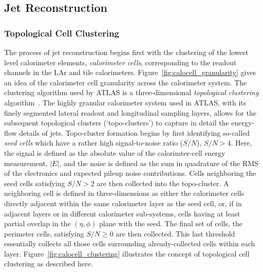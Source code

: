 \FloatBarrier
\subsection{Jet Reconstruction}
\label{sec:jet_reco}

\subsubsection{Topological Cell Clustering}
\label{sec:jet_topo_cluster}

The process of jet reconstruction begins first with the clustering of the lowest level calorimeter elements,
\textit{calorimeter cells}, corresponding to the readout channels in the LAr and tile calorimeters.
Figure~\ref{fig:calocell_granularity} gives an idea of the calorimeter cell granularity across the calorimeter
system.
The clustering algorithm used by ATLAS is a three-dimensional \textit{topological clustering} algorithm~\cite{Lampl:2008zz,Aad:2016upy}.
The highly granular calorimeter system used in ATLAS, with its finely segmented lateral readout and longitudinal sampling layers,
allows for the subsequent topological clusters (`topo-clusters') to capture in detail the energy-flow details of jets.
Topo-cluster formation begins by first identifying so-called \textit{seed cells} which have a rather high signal-to-noise ratio ($S/N$),
$S/N>4$.
Here, the signal is defined as the absolute value of the calorimter-cell energy measurement, $\lvert E \rvert$,
and the noise is defined as the sum in quadrature of the RMS of the electronics and expected pileup noise contributions.
Cells neighboring the seed cells satisfying $S/N>2$ are then collected into the topo-cluster.
A neighboring cell is defined in three-dimensions as either the calorimeter cells directly adjacent within the same calorimeter layer as
the seed cell, or, if in adjacent layers or in different calorimeter sub-systems, cells having at least partial overlap
in the $(\eta,\phi)$ plane with the seed.
The final set of cells, the perimeter cells, satisfying $S/N\ge0$ are then collected.
This last threshold essentially collects all those cells surrounding already-collected cells within each layer.
Figure~\ref{fig:calocell_clustering} illustrates the concept of topological cell clustering as described here.

